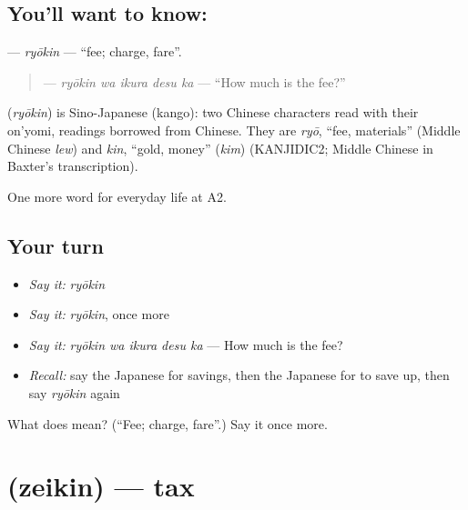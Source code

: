 \subsection*{You'll want to know: }
\textbf{} — \emph{ryōkin} — \textquotedblleft{}fee; charge, fare\textquotedblright{}.

\begin{quote}
\textbf{ } — \emph{ryōkin wa ikura desu ka} — \textquotedblleft{}How much is the fee?\textquotedblright{}
\end{quote}

\begin{cousinweb}
\textbf{} (\emph{ryōkin}) is Sino-Japanese (kango): two Chinese characters read with their on'yomi, readings borrowed from Chinese. They are \emph{ryō}, \textquotedblleft{}fee, materials\textquotedblright{} (Middle Chinese \emph{lew}) and \emph{kin}, \textquotedblleft{}gold, money\textquotedblright{} (\emph{kim}) (KANJIDIC2; Middle Chinese in Baxter's transcription).
\end{cousinweb}

\begin{grammarlens}[title={What you've built}]
One more word for everyday life at A2.
\end{grammarlens}

\subsection*{Your turn}
\begin{itemize}
\raggedright
  \item \emph{Say it:} \emph{ryōkin}
  \item \emph{Say it:} \emph{ryōkin}, once more
  \item \emph{Say it:} \emph{ryōkin wa ikura desu ka} — How much is the fee?
  \item \emph{Recall:} say the Japanese for savings, then the Japanese for to save up, then say \emph{ryōkin} again
\end{itemize}

\begin{tcolorbox}[breakable,colback=teal!4,colframe=teal!35!black,title={Before you move on}]
What does  mean? (\textquotedblleft{}Fee; charge, fare\textquotedblright{}.) Say it once more.
\end{tcolorbox}
\section[\texorpdfstring{\ja{ぜいきん} (zeikin)}{ぜいきん (zeikin)}]{ (zeikin) — tax}


